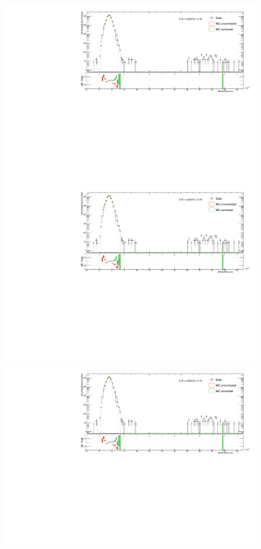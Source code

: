 \begin{figure}[hb]
\centering
\parbox{0.495\textwidth}{
  \centering
  \includegraphics[width=\linewidth,page=4]{graphics/dedx/dEdx_DataVsMC.pdf}\\
  \includegraphics[width=\linewidth,page=14]{graphics/dedx/dEdx_DataVsMC.pdf}\\
  \includegraphics[width=\linewidth,page=24]{graphics/dedx/dEdx_DataVsMC.pdf}\\
}
\end{figure}
